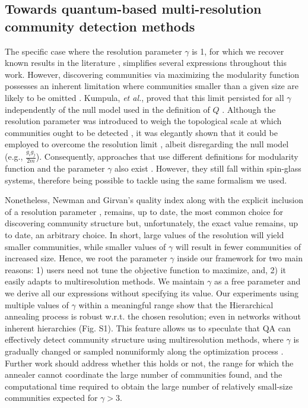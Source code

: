 \documentclass[pdflatex,sn-mathphys-num]{sn-jnl}%
\begin{document}
\subsection*{Towards quantum-based multi-resolution community detection methods}
The specific case where the resolution parameter $\gamma$ is 1, for which we recover known results in the literature \cite{Newman2006}, simplifies several expressions throughout this work. However, discovering communities via maximizing the modularity function possesses an inherent limitation where communities smaller than a given size are likely to be omitted \cite{Fortunato2007}. Kumpula, \textit{et al.}, proved that this limit persisted for all $\gamma$ independently of the null model used in the definition of $Q$ \cite{Kumpula2007}. Although the resolution parameter was introduced to weigh the topological scale at which communities ought to be detected \cite{Reichardt2006}, it was elegantly shown that it could be employed to overcome the resolution limit \cite{Traag2011}, albeit disregarding the null model (e.g., $\frac{g_ig_j}{2m}$). Consequently, approaches that use different definitions for modularity function and the parameter $\gamma$ also exist \cite{reichardt2004detecting,raghavan2007near,Arenas2008,ronhovde2010local}. However, they still fall within spin-glass systems, therefore being possible to tackle using the same formalism we used. 

Nonetheless, Newman and Girvan's quality index \cite{Newman-Girvan_2004} along with the explicit inclusion of a resolution parameter \cite{Reichardt2006}, remains, up to date, the most common choice for discovering community structure but, unfortunately, the exact value remains, up to date, an arbitrary choice. In short, large values of the resolution will yield smaller communities, while smaller values of $\gamma$ will result in fewer communities of increased size. Hence, we root the parameter $\gamma$ inside our framework for two main reasons: 1) users need not tune the objective function to maximize, and, 2) it easily adapts to multiresolution methods. We maintain $\gamma$ as a free parameter and we derive all our expressions without specifying its value. Our experiments using multiple values of $\gamma$ within a meaningful range show that the Hierarchical annealing process is robust w.r.t. the chosen resolution; even in networks without inherent hierarchies (Fig. S1). This feature allows us to speculate that QA can effectively detect community structure using multiresolution methods, where $\gamma$ is gradually changed or sampled nonuniformly along the optimization process \cite{Jeub2018}. Further work should address whether this holds or not, the range for which the annealer cannot coordinate the large number of communities found, and the computational time required to obtain the large number of relatively small-size communities expected for $\gamma > 3$.
\end{document}
